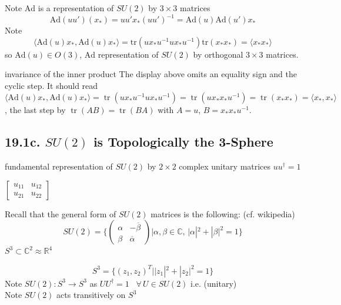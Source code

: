 Note $\text{Ad}$ is a representation of $SU(2)$ by $3\times 3$ matrices
\[
\text{Ad}(uu')(x_*) = uu'x_* (uu')^{-1} = \text{Ad}(u)\text{Ad}(u')x_*
\]
Note
\[
\langle \text{Ad}(u)x_* , \text{Ad}(u) x_* \rangle = \text{tr}(ux_*u^{-1}ux_*u^{-1}) \text{tr}(x_* x_*) = \langle x_* x_* \rangle
\]
so $\text{Ad}(u) \in O(3)$, $\text{Ad}$ representation of $SU(2)$ by orthogonal $3\times 3$ matrices.

\begin{correction}{invariance of the inner product}
The display above omits an equality sign and the cyclic step. It should read $\langle\mathrm{Ad}(u)x_*,\mathrm{Ad}(u)x_*\rangle=\operatorname{tr}(ux_*u^{-1}ux_*u^{-1})=\operatorname{tr}(ux_*x_*u^{-1})=\operatorname{tr}(x_*x_*)=\langle x_*,x_*\rangle$, the last step by $\operatorname{tr}(AB)=\operatorname{tr}(BA)$ with $A=u$, $B=x_*x_*u^{-1}$.
\end{correction}

\subsection{19.1c. $SU(2)$ is Topologically the 3-Sphere}

fundamental representation of $SU(2)$ by $2\times 2$ complex unitary matrices $uu^{\dag}=1$

$\left[ \begin{matrix} u_{11} & u_{12} \\ u_{21} & u_{22} \end{matrix} \right]$

Recall that the general form of $SU(2)$ matrices is the following: (cf. wikipedia)
\[
SU(2) = \lbrace \left( \begin{matrix} \alpha & - \overline{\beta} \\ \beta & \overline{\alpha} \end{matrix} \right) | \alpha , \beta \in \mathbb{C}, \, |\alpha|^2 + |\beta|^2 = 1 \rbrace
\]
$S^3 \subset \mathbb{C}^2 \approx \mathbb{R}^4$

\[
S^3 = \lbrace (z_1, z_2)^T | |z_1|^2 + |z_2|^2 = 1 \rbrace
\]
Note $SU(2) : S^3 \to S^3$ as $UU^{\dag}=1$ \quad \, $\forall \, U \in SU(2)$ i.e. (unitary) \\
Note $SU(2)$ acts transitively on $S^3$ \\


